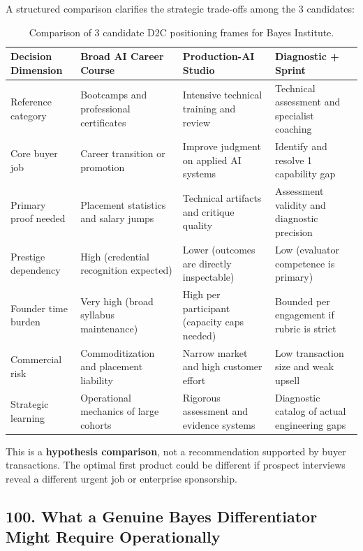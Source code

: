 A structured comparison clarifies the strategic trade-offs among the 3 candidates:

\begin{table}[t]
\centering
\small
\begin{tabularx}{\textwidth}{>{\raggedright\arraybackslash}p{3.2cm} >{\raggedright\arraybackslash}X >{\raggedright\arraybackslash}X >{\raggedright\arraybackslash}X}
\toprule
\textbf{Decision Dimension} & \textbf{Broad AI Career Course} & \textbf{Production-AI Studio} & \textbf{Diagnostic + Sprint} \\
\midrule
Reference category & Bootcamps and professional certificates & Intensive technical training and review & Technical assessment and specialist coaching \\
Core buyer job & Career transition or promotion & Improve judgment on applied AI systems & Identify and resolve 1 capability gap \\
Primary proof needed & Placement statistics and salary jumps & Technical artifacts and critique quality & Assessment validity and diagnostic precision \\
Prestige dependency & High (credential recognition expected) & Lower (outcomes are directly inspectable) & Low (evaluator competence is primary) \\
Founder time burden & Very high (broad syllabus maintenance) & High per participant (capacity caps needed) & Bounded per engagement if rubric is strict \\
Commercial risk & Commoditization and placement liability & Narrow market and high customer effort & Low transaction size and weak upsell \\
Strategic learning & Operational mechanics of large cohorts & Rigorous assessment and evidence systems & Diagnostic catalog of actual engineering gaps \\
\bottomrule
\end{tabularx}
\caption{Comparison of 3 candidate D2C positioning frames for Bayes Institute.}
\label{tab:ch8-d2c-comparison}
\end{table}

This is a \textbf{hypothesis comparison}, not a recommendation supported by buyer transactions. The optimal first product could be different if prospect interviews reveal a different urgent job or enterprise sponsorship.

\subsection*{100. What a Genuine Bayes Differentiator Might Require Operationally}

